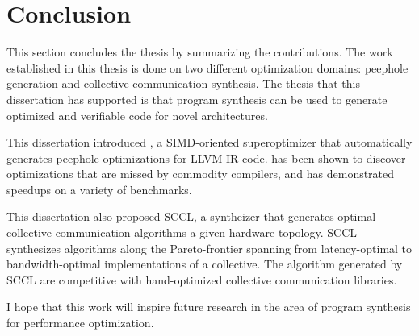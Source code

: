 \chapter{Conclusion}
\label{chap:conclusion}

This section concludes the thesis by summarizing the contributions.
%
The work established in this thesis is done on two different optimization
domains: peephole generation and collective communication synthesis.
%
The thesis that this dissertation has supported is that program synthesis can
be used to generate optimized and verifiable code for novel architectures.


This dissertation introduced \minotaur{}, a SIMD-oriented
superoptimizer that automatically
 generates peephole optimizations for LLVM IR code.
%
\minotaur{} has been shown to discover optimizations that are missed by
commodity compilers, and has demonstrated speedups on a variety of
benchmarks.

This dissertation also proposed SCCL, a syntheizer that generates
optimal collective communication algorithms a given hardware topology.
%
SCCL synthesizes algorithms along the Pareto-frontier spanning from
latency-optimal to bandwidth-optimal implementations of a collective.
%
The algorithm generated by SCCL are competitive with hand-optimized
collective communication libraries.


I hope that this work will inspire future research in the area of program
synthesis for performance optimization.
